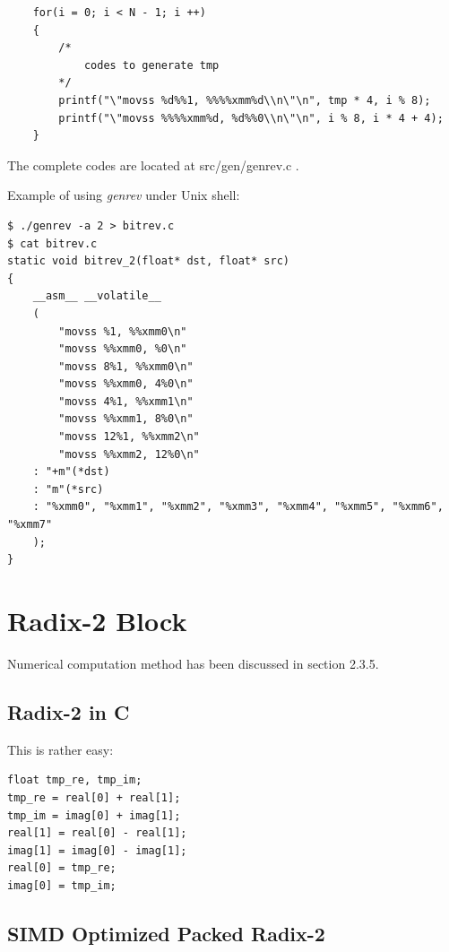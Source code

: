 \documentclass[a4paper]{report}
\begin{document}
        \lstset{language = c, tabsize = 4}
        \begin{lstlisting}
    for(i = 0; i < N - 1; i ++)
    {
    	/*
    		codes to generate tmp
    	*/
        printf("\"movss %d%%1, %%%%xmm%d\\n\"\n", tmp * 4, i % 8);
        printf("\"movss %%%%xmm%d, %d%%0\\n\"\n", i % 8, i * 4 + 4);
	}
        \end{lstlisting}

	The complete codes are located at src/gen/genrev.c .
	
	Example of using \textit{genrev} under Unix shell:

        \lstset{language = sh, tabsize = 4}
        \begin{lstlisting}
$ ./genrev -a 2 > bitrev.c
$ cat bitrev.c
static void bitrev_2(float* dst, float* src)
{
    __asm__ __volatile__
    (
        "movss %1, %%xmm0\n"
        "movss %%xmm0, %0\n"
        "movss 8%1, %%xmm0\n"
        "movss %%xmm0, 4%0\n"
        "movss 4%1, %%xmm1\n"
        "movss %%xmm1, 8%0\n"
        "movss 12%1, %%xmm2\n"
        "movss %%xmm2, 12%0\n"
    : "+m"(*dst)
    : "m"(*src)
    : "%xmm0", "%xmm1", "%xmm2", "%xmm3", "%xmm4", "%xmm5", "%xmm6", "%xmm7"
    );
}
        \end{lstlisting}

\section{Radix-2 Block} \indent

	Numerical computation method has been discussed in section 2.3.5.

\subsection{Radix-2 in C} \indent

	This is rather easy:
	
    \lstset{language = c, tabsize = 4}
    \begin{lstlisting}
float tmp_re, tmp_im;
tmp_re = real[0] + real[1];
tmp_im = imag[0] + imag[1];
real[1] = real[0] - real[1];
imag[1] = imag[0] - imag[1];
real[0] = tmp_re;
imag[0] = tmp_im;
    \end{lstlisting}

\subsection{SIMD Optimized Packed Radix-2} \indent
\end{document}

